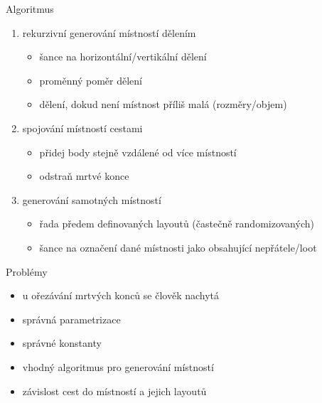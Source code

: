 \documentclass[czech]{beamer}
\begin{document}
	\begin{frame}{Algoritmus}
		\begin{enumerate}
			\item rekurzivní generování místností dělením
			\begin{itemize}
				\item šance na horizontální/vertikální dělení
				\item proměnný poměr dělení
				\item dělení, dokud není místnost příliš malá (rozměry/objem)
			\end{itemize}
			\item spojování místností cestami
			\begin{itemize}
				\item přidej body stejně vzdálené od více místností
				\item odstraň mrtvé konce
			\end{itemize}
			\item generování samotných místností
			\begin{itemize}
				\item řada předem definovaných layoutů (častečně randomizovaných)
				\item šance na označení dané místnosti jako obsahující nepřátele/loot
			\end{itemize}
		\end{enumerate}
	\end{frame}

	\begin{frame}{Problémy}
		\begin{itemize}
			\item u ořezávání mrtvých konců se člověk nachytá
			\item správná parametrizace
			\item správné konstanty
			\item vhodný algoritmus pro generování místností
			\item závislost cest do místností a jejich layoutů
		\end{itemize}
	\end{frame}
\end{document}
